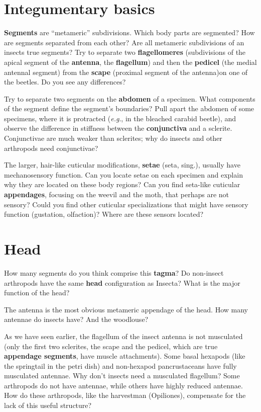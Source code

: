 \documentclass[letterpaper, 11pt]{article}
\begin{document}
\section*{Integumentary basics}
\textbf{Segments} are ``metameric'' subdivisions. Which body parts are segmented? How are segments separated from each other? Are all metameric subdivisions of an insects true segments? Try to separate two \textbf{flagellomeres} (subdivisions of the apical segment of the \textbf{antenna}, the \textbf{flagellum}) and then the \textbf{pedicel} (the medial antennal segment) from the \textbf{scape} (proximal segment of the antenna)on one of the beetles. Do you see any differences?
\vspace{30 mm}

\noindent{}Try to separate two segments on the \textbf{abdomen} of a specimen. What components of the segment define the segment's boundaries? Pull apart the abdomen of some specimens, where it is protracted (\textit{e.g}., in the bleached carabid beetle), and observe the difference in stiffness between the \textbf{conjunctiva} and a sclerite. Conjunctivae are much weaker than sclerites; why do insects and other arthropods need conjunctivae?
\vspace{30 mm}

\noindent{}The larger, hair-like cuticular modifications, \textbf{setae} (seta, sing.), usually have mechanosensory function. Can you locate setae on each specimen and explain why they are located on these body regions? Can you find seta-like cuticular \textbf{appendages}, focusing on the weevil and the moth, that perhaps are not sensory? Could you find other cuticular specializations that might have sensory function (gustation, olfaction)? Where are these sensors located?
\vspace{30 mm}

\section*{Head}
How many segments do you think comprise this \textbf{tagma}? Do non-insect arthropods have the same \textbf{head} configuration as Insecta? What is the major function of the head? 
\vspace{30 mm}

\noindent{}The antenna is the most obvious metameric appendage of the head. How many antennae do insects have? And the woodlouse?
\vspace{30 mm}

\noindent{}As we have seen earlier, the flagellum of the insect antenna is not musculated (only the first two sclerites, the scape and the pedicel, which are true \textbf{appendage segments}, have muscle attachments). Some basal hexapods (like the springtail in the petri dish) and non-hexapod pancrustaceans have fully musculated antennae. Why don’t insects need a musculated flagellum? Some arthropods do not have antennae, while others have highly reduced antennae. How do these arthropods, like the harvestman (Opiliones), compensate for the lack of this useful structure?
\vspace{30 mm}
\end{document}
